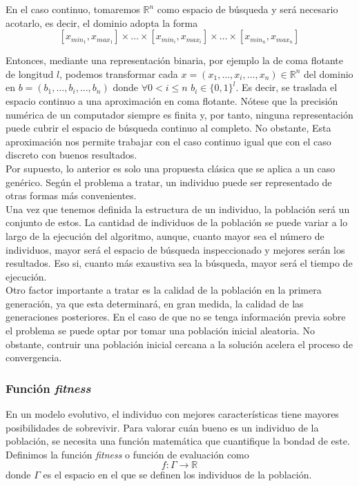 			En el caso continuo, tomaremos ${\mathbb{R}^n}$ como espacio de b\'usqueda y ser\'a necesario acotarlo, es decir, el dominio adopta la forma \\
			\[[x_{min_1}, x_{max_1}]\times\dots\times[x_{min_i},x_{max_i}]\times\dots\times[x_{min_n},x_{max_n}]\]
			
			Entonces, mediante una representaci\'on binaria, por ejemplo la de coma flotante de longitud $l$, podemos transformar cada $x=(x_1,\dots,x_i,\dots,x_n) \in \mathbb{R}^n$ del dominio en $b=(b_1,\dots,b_i,\dots,b_n)$ donde $\forall  0<i\leq n$ $b_i \in \{0,1\}^l$. Es decir, se traslada el espacio continuo a una aproximaci\'on en coma flotante. N\'otese que la precisi\'on num\'erica de un computador siempre es finita y, por tanto, ninguna representaci\'on puede cubrir el espacio de b\'usqueda continuo al completo. No obstante, Esta aproximaci\'on nos permite trabajar con el caso continuo igual que con el caso discreto con buenos resultados.\\
			
			Por supuesto, lo anterior es solo una propuesta cl\'asica que se aplica a un caso gen\'erico. Seg\'un el problema a tratar, un individuo puede ser representado de otras formas m\'as convenientes.\\
			
			Una vez que tenemos definida la estructura de un individuo, la poblaci\'on ser\'a un conjunto de estos. La cantidad de individuos de la poblaci\'on se puede variar a lo largo de la ejecuci\'on del algoritmo, aunque, cuanto mayor sea el n\'umero de individuos, mayor ser\'a el espacio de b\'usqueda inspeccionado y mejores ser\'an los resultados. Eso si, cuanto m\'as exaustiva sea la b\'usqueda, mayor ser\'a el tiempo de ejecuci\'on.\\
			
			Otro factor importante a tratar es la calidad de la poblaci\'on en la primera generaci\'on, ya que esta determinar\'a, en gran medida, la calidad de las generaciones posteriores. En el caso de que no se tenga informaci\'on previa sobre el problema se puede optar por tomar una poblaci\'on inicial aleatoria. No obstante, contruir una poblaci\'on inicial cercana a la soluci\'on acelera el proceso de convergencia. \\
				
			\subsubsection{Funci\'on \textit{fitness}}
			En un modelo evolutivo, el individuo con mejores caracter\'isticas tiene mayores posibilidades de sobrevivir. Para valorar cu\'an bueno es un individuo de la poblaci\'on, se necesita una funci\'on matem\'atica que cuantifique la bondad de este. Definimos la funci\'on \textit{fitness} o funci\'on de evaluaci\'on como 
			\[f:\Gamma\rightarrow\mathbb{R}\]
			donde $\Gamma$ es el espacio en el que se definen los individuos de la poblaci\'on.\\
			
